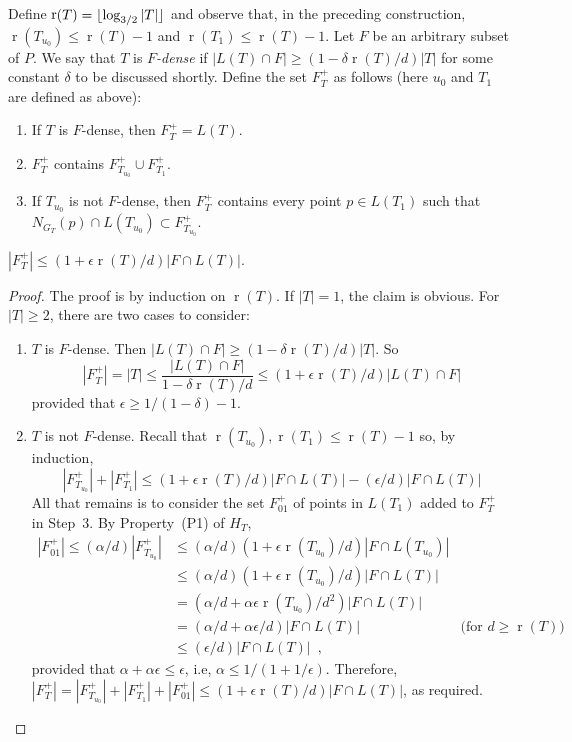 \documentclass{patmorin}
\DeclareMathOperator{\rank}{r}
\begin{document}
Define $\rank(T)=\floor{\log_{3/2} |T|}$ and observe that, in
the preceding construction, $\rank(T_{u_0}) \le \rank(T)-1$ and
$\rank(T_1)\le\rank(T)-1$.  Let $F$ be an arbitrary subset of $P$.  We say
that $T$ is \emph{$F$-dense} if $|L(T)\cap F|\ge (1-\delta\rank(T)/d)|T|$
for some constant $\delta$ to be discussed shortly.  Define the set
$F^+_T$ as follows (here $u_0$ and $T_1$ are defined as above):

\begin{enumerate}
  \item If $T$ is $F$-dense, then $F^+_T=L(T)$.
  \item $F^+_T$ contains $F^+_{T_{u_0}}\cup F^+_{T_1}$.
  \item If $T_{u_0}$ is not $F$-dense, then $F^+_T$ contains every point $p\in L(T_1)$ such that $N_{G_T}(p)\cap L(T_{u_0})\subset F^+_{T_{u_0}}$.
\end{enumerate}


\begin{clm}
	$|F^+_T| \le (1+\epsilon\rank(T)/d)|F\cap L(T)|$.
\end{clm}

\begin{proof}
  The proof is by induction on $\rank(T)$. If $|T|=1$, the claim is
  obvious. For $|T|\ge 2$, there are two cases to consider:
  \begin{enumerate}
    \item $T$ is $F$-dense. Then  $|L(T)\cap F|\ge
    (1-\delta\rank(T)/d)|T|$.  So
     \[
       |F^+_T|=|T|
	  \le \frac{|L(T)\cap F|}{1-\delta\rank(T)/d} 
          \le (1+\epsilon\rank(T)/d)|L(T)\cap F|
     \]
     provided that $\epsilon \ge 1/(1-\delta)-1$.

    \item $T$ is not $F$-dense. Recall that
    $\rank(T_{u_0}),\rank(T_1)\le\rank(T)-1$ so, by induction,
     \[
        |F^+_{T_{u_0}}|	+ |F^+_{T_{1}}| 
          \le (1+\epsilon\rank(T)/d)|F\cap L(T)| - (\epsilon/d)|F\cap L(T)|
     \]
     All that remains is to consider the set $F^+_{01}$ of points in 
     $L(T_1)$ added to $F^+_T$ in Step~3.  By Property~(P1) of $H_T$,
     \begin{align*}
      |F^+_{01}| \le (\alpha/d)|F^+_{T_{u_0}}|
        & \le (\alpha/d)(1+\epsilon\rank(T_{u_0})/d)|F\cap L(T_{u_0})| \\
        & \le (\alpha/d)(1+\epsilon\rank(T_{u_0})/d)|F\cap L(T)|\\
        & = (\alpha/d+\alpha\epsilon\rank(T_{u_0})/d^2)|F\cap L(T)| \\
        & = (\alpha/d+\alpha\epsilon/d)|F\cap L(T)| 
	     & \text{(for $d\ge \rank(T)$)} \\
	& \le (\epsilon/d)|F\cap L(T)| \enspace ,
   \end{align*}
   provided that $\alpha+\alpha\epsilon \le \epsilon$, i.e, 
   $\alpha \le 1/(1+1/\epsilon)$. Therefore, 
   $|F^+_T| = |F^+_{T_{u_0}}| + |F^+_{T_1}| + |F^+_{01}| \le (1+\epsilon\rank(T)/d)|F\cap L(T)|$, as required. \qedhere
   \end{enumerate}
\end{proof}
\end{document}
